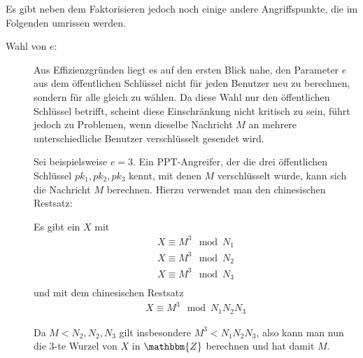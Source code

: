 Es gibt neben dem Faktorisieren jedoch noch einige andere
Angriffspunkte, die im Folgenden umrissen werden. 

\begin{description}
\item[Wahl von $e$:] Aus Effizienzgründen liegt es auf den ersten Blick
  nahe, den Parameter $e$ aus dem öffentlichen Schlüssel nicht für jeden
  Benutzer neu zu berechnen, sondern für alle gleich zu wählen. Da diese
  Wahl nur den öffentlichen Schlüssel betrifft, scheint diese
  Einschränkung nicht kritisch zu sein, führt jedoch zu Problemen, wenn
  dieselbe Nachricht $M$ an mehrere unterschiedliche Benutzer
  verschlüsselt gesendet wird. 
  
  Sei beispielsweise $e=3$. Ein PPT-Angreifer, der die drei öffentlichen
  Schlüssel $pk_1, pk_2, pk_3$ kennt, mit denen $M$ verschlüsselt wurde,
  kann sich die Nachricht $M$ berechnen. Hierzu verwendet man den
  chinesischen Restsatz:

  Es gibt ein $X$ mit
  \begin{align*}
    X \equiv M^3 \mod N_1\\
    X \equiv M^3 \mod N_2\\
    X \equiv M^3 \mod N_3\\
  \end{align*}
  und mit dem chinesischen Restsatz
  \begin{align*}
    X \equiv M^3 \mod N_1N_2N_3
  \end{align*}

Da $M < N_2, N_2, N_3$ gilt insbesondere $M^3<N_1N_2N_3$, also kann man nun die $3$-te Wurzel von $X$ in $\mathbbm{Z}$
berechnen und hat damit $M$.
    

\end{description}
